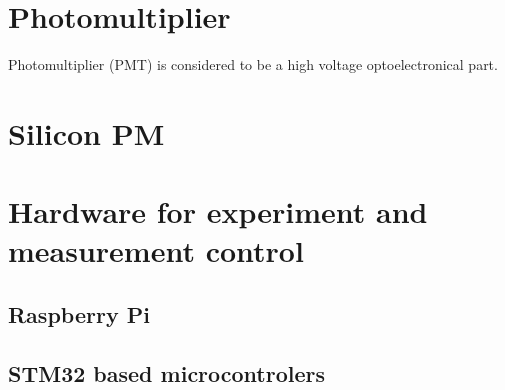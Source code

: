 \section{Photomultiplier}
Photomultiplier (PMT) is considered to be a high voltage optoelectronical part.

\section{Silicon PM}


\section{Hardware for experiment and measurement control}
\subsection{Raspberry Pi}

\subsection{STM32 based microcontrolers}
